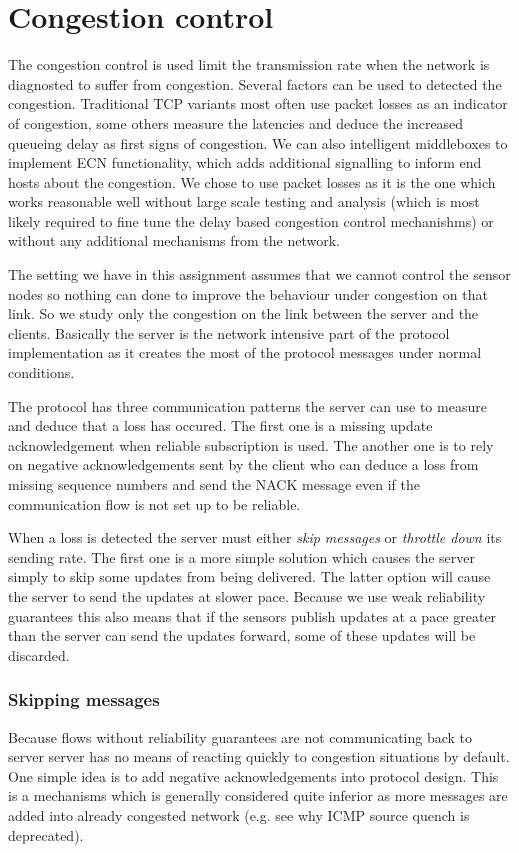 \chapter{Congestion control}
The congestion control is used limit the transmission rate when the network is
diagnosted to suffer from congestion. Several factors can be used to detected
the congestion. Traditional TCP variants most often use packet losses as an
indicator of congestion, some others measure the latencies and deduce the
increased queueing delay as first signs of congestion. We can also intelligent
middleboxes to implement ECN functionality, which adds additional signalling to
inform end hosts about the congestion. We chose to use packet losses as it is
the one which works reasonable well without large scale testing and analysis
(which is most likely required to fine tune the delay based congestion control mechanishms) or
without any additional mechanisms from the network.

The setting we have in this assignment assumes that we cannot control the sensor nodes
so nothing can done to improve the behaviour under congestion on that link. So
we study only the congestion on the link between the server and the clients.
Basically the server is the network intensive part of the protocol
implementation as it creates
the most of the protocol messages under normal conditions.

The protocol has three communication patterns the server can use to measure and
deduce that a loss has occured. The first one is a missing update
acknowledgement when reliable subscription is used. The another one is to rely
on negative acknowledgements sent by the client who can deduce a loss from
missing sequence numbers and send the NACK message even if the communication
flow is not set up to be reliable.

When a loss is detected the server must either \textit{skip messages} or
\textit{throttle down} its sending rate. The first one is a more simple solution
which causes the server simply to skip some updates from being delivered. The
latter option will cause the server to send the updates at slower pace. Because
we use weak reliability guarantees this also means that if the sensors publish
updates at a pace greater than the server can send the updates forward, some of
these updates will be discarded.


\subsection{Skipping messages}
Because flows without reliability guarantees are not communicating back to
server server has no means of reacting quickly to congestion situations by
default. One simple idea is to add negative acknowledgements into protocol
design. This is a mechanisms which is generally considered quite inferior as
more messages are added into already congested network (e.g. see why ICMP source
quench is deprecated).

